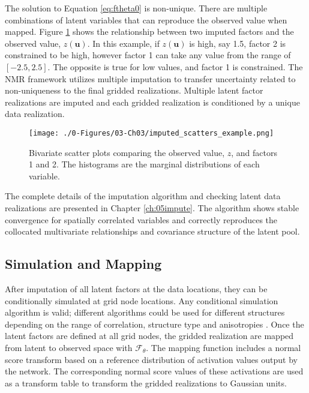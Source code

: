 The solution to Equation \ref{eq:ftheta0} is non-unique. There are multiple combinations of latent variables that can reproduce the observed value when mapped. Figure \ref{fig:imputed_scatters_example} shows the relationship between two imputed factors and the observed value, $z(\mathbf{u})$. In this example, if $z(\mathbf{u})$ is high, say 1.5, factor 2 is constrained to be high, however factor 1 can take any value from the range of $[-2.5, 2.5]$. The opposite is true for low values, and factor 1 is constrained. The \gls{NMR} framework utilizes multiple imputation to transfer uncertainty related to non-uniqueness to the final gridded realizations. Multiple latent factor realizations are imputed and each gridded realization is conditioned by a unique data realization.

\begin{figure}[htb!]
    \centering
    \texttt{[image: ./0-Figures/03-Ch03/imputed\_scatters\_example.png]}
    \caption{Bivariate scatter plots comparing the observed value, $z$, and factors 1 and 2. The histograms are the marginal distributions of each variable. }
    \label{fig:imputed_scatters_example}
\end{figure}

The complete details of the imputation algorithm and checking latent data realizations are presented in Chapter \ref{ch:05impute}. The algorithm shows stable convergence for spatially correlated variables and correctly reproduces the collocated multivariate relationships and covariance structure of the latent pool.

\FloatBarrier
\subsection{Simulation and Mapping}
\label{subsec:03simulate}

After imputation of all latent factors at the data locations, they can be conditionally simulated at grid node locations. Any conditional simulation algorithm is valid; different algorithms could be used for different structures depending on the range of correlation, structure type and anisotropies \citep{pinto2020independent}. Once the latent factors are defined at all grid nodes, the gridded realization are mapped from latent to observed space with $\mathcal{F}_{\theta}$. The mapping function includes a normal score transform based on a reference distribution of activation values output by the network. The corresponding normal score values of these activations are used as a transform table to transform the gridded realizations to Gaussian units.

